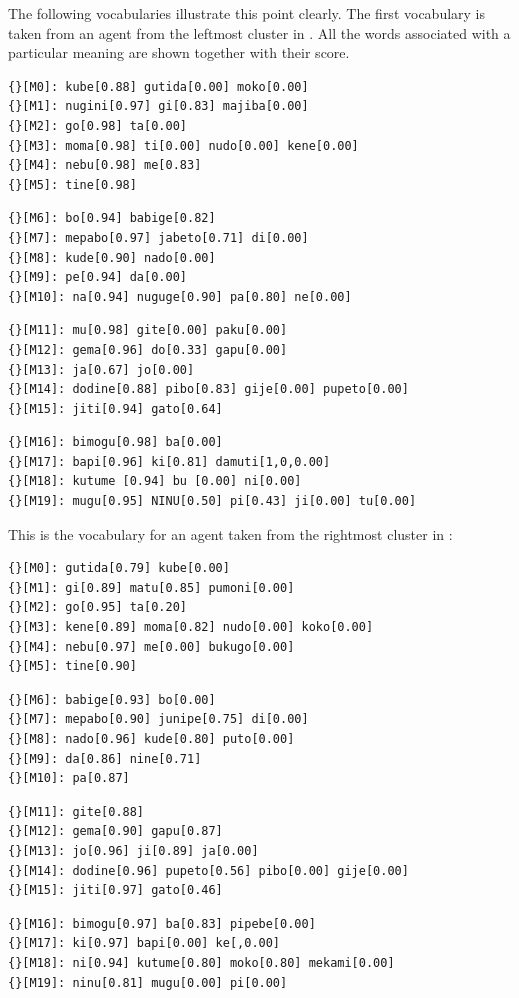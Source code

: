 The following vocabularies illustrate this point clearly.
The first vocabulary is taken from an agent from the
leftmost cluster in . 
All the words associated with a particular meaning are 
shown together with their score. 
\begin{verbatim}
{}[M0]: kube[0.88] gutida[0.00] moko[0.00]
{}[M1]: nugini[0.97] gi[0.83] majiba[0.00]
{}[M2]: go[0.98] ta[0.00]
{}[M3]: moma[0.98] ti[0.00] nudo[0.00] kene[0.00]
{}[M4]: nebu[0.98] me[0.83]
{}[M5]: tine[0.98]
\end{verbatim}
\begin{verbatim}
{}[M6]: bo[0.94] babige[0.82]
{}[M7]: mepabo[0.97] jabeto[0.71] di[0.00]
{}[M8]: kude[0.90] nado[0.00]
{}[M9]: pe[0.94] da[0.00]
{}[M10]: na[0.94] nuguge[0.90] pa[0.80] ne[0.00]
\end{verbatim}
\begin{verbatim}
{}[M11]: mu[0.98] gite[0.00] paku[0.00]
{}[M12]: gema[0.96] do[0.33] gapu[0.00]
{}[M13]: ja[0.67] jo[0.00]
{}[M14]: dodine[0.88] pibo[0.83] gije[0.00] pupeto[0.00]
{}[M15]: jiti[0.94] gato[0.64]
\end{verbatim}
\begin{verbatim}
{}[M16]: bimogu[0.98] ba[0.00]
{}[M17]: bapi[0.96] ki[0.81] damuti[1,0,0.00]
{}[M18]: kutume [0.94] bu [0.00] ni[0.00]
{}[M19]: mugu[0.95] NINU[0.50] pi[0.43] ji[0.00] tu[0.00]
\end{verbatim}
This is the vocabulary for an agent taken from the
rightmost cluster in :
\begin{verbatim}
{}[M0]: gutida[0.79] kube[0.00]
{}[M1]: gi[0.89] matu[0.85] pumoni[0.00]
{}[M2]: go[0.95] ta[0.20]
{}[M3]: kene[0.89] moma[0.82] nudo[0.00] koko[0.00]
{}[M4]: nebu[0.97] me[0.00] bukugo[0.00]
{}[M5]: tine[0.90]
\end{verbatim}
\begin{verbatim}
{}[M6]: babige[0.93] bo[0.00]
{}[M7]: mepabo[0.90] junipe[0.75] di[0.00]
{}[M8]: nado[0.96] kude[0.80] puto[0.00]
{}[M9]: da[0.86] nine[0.71]
{}[M10]: pa[0.87]
\end{verbatim}
\begin{verbatim}
{}[M11]: gite[0.88]
{}[M12]: gema[0.90] gapu[0.87]
{}[M13]: jo[0.96] ji[0.89] ja[0.00]
{}[M14]: dodine[0.96] pupeto[0.56] pibo[0.00] gije[0.00]
{}[M15]: jiti[0.97] gato[0.46]
\end{verbatim}
\begin{verbatim}
{}[M16]: bimogu[0.97] ba[0.83] pipebe[0.00]
{}[M17]: ki[0.97] bapi[0.00] ke[,0.00]
{}[M18]: ni[0.94] kutume[0.80] moko[0.80] mekami[0.00]
{}[M19]: ninu[0.81] mugu[0.00] pi[0.00]
\end{verbatim}
